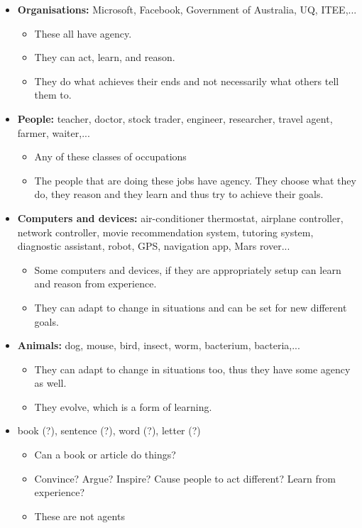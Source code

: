 \documentclass[12pt]{article}
\begin{document}
\begin{itemize}
    \item \textbf{Organisations:} Microsoft, Facebook, Government of Australia, UQ, ITEE,...
    \begin{itemize}
        \item These all have agency.
        \item They can act, learn, and reason.
        \item They do what achieves their ends and not necessarily what others tell them to.
    \end{itemize}
    \newpage
    \item \textbf{People:} teacher, doctor, stock trader, engineer, researcher, travel agent, farmer, waiter,...
    \begin{itemize}
        \item Any of these classes of occupations
        \item The people that are doing these jobs have agency. They choose what they do, they reason and they learn and thus try to achieve their goals.
    \end{itemize}
    \item \textbf{Computers and devices:} air-conditioner thermostat, airplane controller, network controller, movie recommendation system, tutoring system, diagnostic assistant, robot, GPS, navigation app, Mars rover...
    \begin{itemize}
        \item Some computers and devices, if they are appropriately setup can learn and reason from experience. \item They can adapt to change in situations and can be set for new different goals. 
    \end{itemize}
    \item \textbf{Animals:} dog, mouse, bird, insect, worm, bacterium, bacteria,...
    \begin{itemize}
        \item They can adapt to change in situations too, thus they have some agency as well.
        \item They evolve, which is a form of learning. 
    \end{itemize}
    \item book (?), sentence (?), word (?), letter (?)
    \begin{itemize}
        \item Can a book or article do things?
        \item Convince? Argue? Inspire? Cause people to act different? Learn from experience?
        \item These are not agents
    \end{itemize}
\end{itemize}
\end{document}
